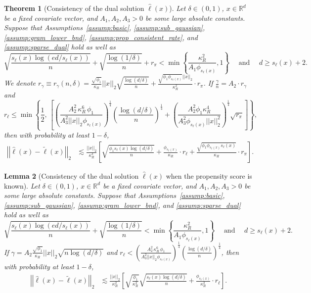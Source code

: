 \documentclass[10pt,a4paper]{amsart}
\theoremstyle{plain}
\newtheorem{theorem}{Theorem}
\newtheorem{lemma}[theorem]{Lemma}
\theoremstyle{remark}
\renewcommand{\hat}{\widehat}
\renewcommand{\tilde}{\widetilde}
\newcommand{\norm}[1]{\left|\left| #1 \right|\right|}
\begin{document}
\begin{theorem}[Consistency of the dual solution $\hat{\ell}(x)$]
	\label{thm:dual_consist2}
	Let $\delta \in (0,1)$, $x\in \mathbb{R}^d$ be a fixed covariate vector, and $A_1,A_2,A_3>0$ be some large absolute constants. Suppose that Assumptions~\ref{assump:basic}, \ref{assump:sub_gaussian}, \ref{assump:gram_lower_bnd}, \ref{assump:prop_consistent_rate}, and \ref{assump:sparse_dual} hold
	as well as
	$$\sqrt{\frac{s_{\ell}(x)\log(ed/s_{\ell}(x))}{n}} + \sqrt{\frac{\log(1/\delta)}{n}} + r_{\pi} < \min\left\{\frac{\kappa_R^2}{A_1 \phi_{s_{\ell}(x)}}, 1 \right\} \quad \text{ and } \quad d\geq s_{\ell}(x) + 2.$$
	We denote $r_{\gamma}\equiv r_{\gamma}(n,\delta) = \frac{\sqrt{\phi_1}}{\kappa_R}\norm{x}_2\sqrt{\frac{\log(d/\delta)}{n}} + \frac{\sqrt{\phi_1 \phi_{s_{\ell}(x)}}\norm{x}_2}{\kappa_R^2} \cdot r_{\pi}$. If $\frac{\gamma}{n} = A_2\cdot r_{\gamma}$ and 
	$$r_{\ell} \leq \min\left\{\frac{1}{2},\, \left[\left(\frac{A_2^2 \,\kappa_R^6\, \phi_1}{A_3^2\norm{x}_2 \phi_{s_{\ell}(x)}}\right)^{\frac{1}{4}} \left(\frac{\log(d/\delta)}{n}\right)^{\frac{1}{4}} + \left(\frac{A_2^2 \phi_1 \kappa_R^4}{A_3^2 \phi_{s_{\ell}(x)} \norm{x}_2^2}\right)^{\frac{1}{4}} \sqrt{r_{\pi}}\right]\right\},$$
	then with probability at least $1-\delta$,
	\begin{align*}
		\norm{\hat{\ell}(x) - \tilde{\ell}(x)}_2
		&\lesssim \frac{\norm{x}_2}{\kappa_R^3}\left[ \sqrt{\frac{\phi_1 s_{\ell}(x)\log(d/\delta)}{n}} + \frac{\phi_{s_{\ell}(x)}}{\kappa_R} \cdot r_{\ell} + \frac{\sqrt{\phi_1 \phi_{s_{\ell}(x)} s_{\ell}(x)}}{\kappa_R} \cdot  r_{\pi} \right].
	\end{align*}
\end{theorem}

\begin{lemma}[Consistency of the dual solution $\hat{\ell}(x)$ when the propensity score is known]
	\label{lem:dual_consist}
	Let $\delta \in (0,1)$,  $x\in \mathbb{R}^d$ be a fixed covariate vector, and $A_1,A_2,A_3>0$ be some large absolute constants. Suppose that Assumptions~\ref{assump:basic}, \ref{assump:sub_gaussian}, \ref{assump:gram_lower_bnd}, and \ref{assump:sparse_dual} hold as well as
	$$\sqrt{\frac{s_{\ell}(x)\log(ed/s_{\ell}(x))}{n}} + \sqrt{\frac{\log(1/\delta)}{n}} < \min\left\{\frac{\kappa_R^2}{A_1\phi_{s_{\ell}(x)}}, 1 \right\} \quad \text{ and } \quad d\geq s_{\ell}(x)+2.$$
	If $\gamma = A_2 \frac{\sqrt{\phi_1}}{\kappa_R}\norm{x}_2 \sqrt{n\log(d/\delta)}$ and $r_{\ell} < \left(\frac{A_2^2 \,\kappa_R^6\, \phi_1}{A_3^2\norm{x}_2 \phi_{s_{\ell}(x)}}\right)^{\frac{1}{4}} \left(\frac{\log(d/\delta)}{n}\right)^{\frac{1}{4}}$, then with probability at least $1-\delta$,
	\begin{align*}
		\norm{\hat{\ell}(x)  - \tilde{\ell}(x)}_2 &\lesssim \frac{\norm{x}_2}{\kappa_R^2}\left[\sqrt{\frac{\phi_1}{\kappa_R^2}} \sqrt{\frac{s_{\ell}(x) \log(d/\delta)}{n}} + \frac{\phi_{s_{\ell}(x)}}{\kappa_R^2} \cdot r_{\ell} \right].
	\end{align*}
\end{lemma}
\end{document}
